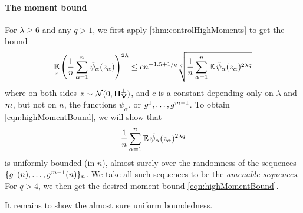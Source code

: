 \documentclass[main.tex]{subfiles}
\begin{document}
\paragraph{The moment bound}
For $\lambda \ge 6$ and any $q > 1$, we first apply \cref{thm:controlHighMoments} to get the bound
\begin{equation*}
\operatorname*{\mathbb{E}}_{z} 
    \left( \frac{1}{n} \sum_{\alpha =1}^n \tilde \psi_\alpha(z_\alpha)\right)^{2\lambda}
    \le c n^{-1.5 + 1/q}
        \sqrt[q]{\frac{1}{n} \sum_{\alpha=1}^n \operatorname*{\mathbb{E}} \tilde \psi_\alpha(z_\alpha)^{2\lambda q}}
\end{equation*}
where on both sides $z \sim \mathcal{N}(0, \boldsymbol{\Pi}^\perp_{\mathbf{V}})$, and $c$ is a constant depending only on $\lambda$ and $m$, but not on $n$, the functions $\psi_\alpha$, or $g^1, \ldots, g^{m-1}$.
To obtain \cref{eqn:highMomentBound}, we will show that
\begin{equation}
\f 1 n \sum_{\alpha=1}^n \EV \tilde \psi_\alpha(\rvec_\alpha)^{2\lambda q}
\label{eqn:moment}
\end{equation}
is uniformly bounded (in $n$), almost surely over the randomness of the sequences $\{g^1(n), \ldots, g^{m -1}(n)\}_n$.
We take all such sequences to be the \emph{amenable sequences}.
For $q > 4$, we then get the desired moment bound \cref{eqn:highMomentBound}.

It remains to show the almost sure uniform boundedness.
\end{document}
